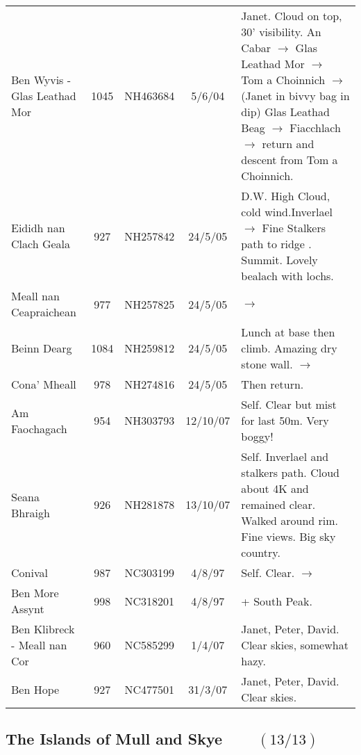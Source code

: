 \documentclass[10pt,a4paper]{article}
\begin{document}
\begin{tabular}{lcccp{6cm}}
Ben Wyvis - Glas Leathad Mor  & 1045 & NH463684 &5/6/04&Janet. Cloud on top, 30' visibility.
An Cabar $\rightarrow$ Glas Leathad Mor $\rightarrow$ Tom a Choinnich $\rightarrow$
(Janet in bivvy bag in dip) Glas Leathad Beag $\rightarrow$ Fiacchlach $\rightarrow$
return and descent from Tom a Choinnich. \\
Eididh nan Clach Geala & 927 & NH257842 &24/5/05&D.W. High Cloud, cold wind.Inverlael
  $\rightarrow$ Fine Stalkers path to ridge . Summit. Lovely bealach with lochs.\\
Meall nan Ceapraichean & 977 & NH257825 &24/5/05&$\rightarrow$ \\
Beinn Dearg & 1084 & NH259812&24/5/05& Lunch at base then climb. Amazing dry stone wall.
$\rightarrow$ \\
Cona' Mheall & 978  & NH274816&24/5/05&Then return. \\
Am Faochagach & 954 & NH303793&12/10/07&Self. Clear but mist for last 50m. Very boggy! \\
Seana Bhraigh & 926  & NH281878&13/10/07&Self. Inverlael and stalkers path. Cloud about 4K and remained
clear. Walked around rim. Fine views. Big sky country.    \\
Conival & 987  & NC303199 &4/8/97& Self. Clear. $\rightarrow$\\
Ben More Assynt & 998 & NC318201 &4/8/97& + South Peak.\\
Ben Klibreck - Meall nan Cor & 960 & NC585299  &1/4/07&Janet, Peter, David. Clear skies, somewhat hazy. \\
Ben Hope & 927  & NC477501 &31/3/07&Janet, Peter, David. Clear skies.   \\
\end{tabular}


\subsection*{The Islands of Mull and Skye $\qquad (13/13)$}
\end{document}
